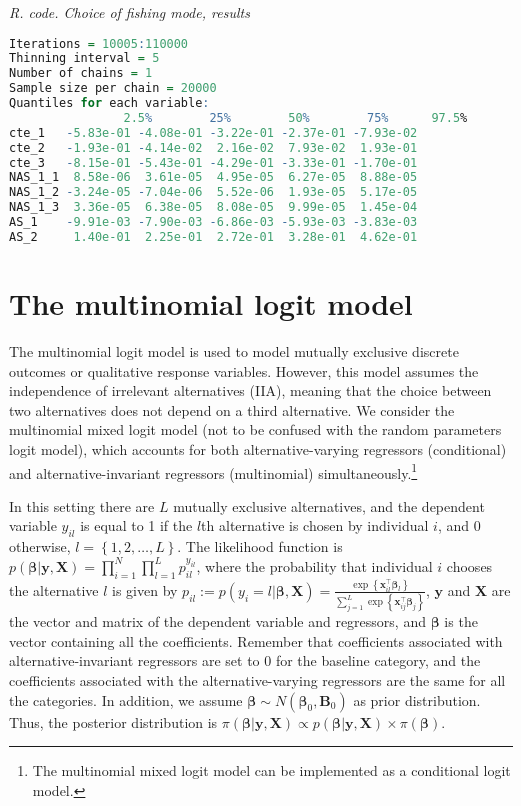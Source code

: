 \begin{tcolorbox}[enhanced,width=4.67in,center upper,
	fontupper=\large\bfseries,drop shadow southwest,sharp corners]
	\textit{R. code. Choice of fishing mode, results}
	\begin{VF}
		\begin{lstlisting}[language=R]	
Iterations = 10005:110000
Thinning interval = 5 
Number of chains = 1 
Sample size per chain = 20000 
Quantiles for each variable:
				2.5%        25%        50%        75%      97.5%
cte_1   -5.83e-01 -4.08e-01 -3.22e-01 -2.37e-01 -7.93e-02
cte_2   -1.93e-01 -4.14e-02  2.16e-02  7.93e-02  1.93e-01
cte_3   -8.15e-01 -5.43e-01 -4.29e-01 -3.33e-01 -1.70e-01
NAS_1_1  8.58e-06  3.61e-05  4.95e-05  6.27e-05  8.88e-05
NAS_1_2 -3.24e-05 -7.04e-06  5.52e-06  1.93e-05  5.17e-05
NAS_1_3  3.36e-05  6.38e-05  8.08e-05  9.99e-05  1.45e-04
AS_1    -9.91e-03 -7.90e-03 -6.86e-03 -5.93e-03 -3.83e-03
AS_2     1.40e-01  2.25e-01  2.72e-01  3.28e-01  4.62e-01		\end{lstlisting}
	\end{VF}
\end{tcolorbox} 


\section{The multinomial logit model}\label{sec65}

The multinomial logit model is used to model mutually exclusive discrete outcomes or qualitative response variables. However, this model assumes the independence of irrelevant alternatives (IIA), meaning that the choice between two alternatives does not depend on a third alternative. We consider the multinomial mixed logit model (not to be confused with the random parameters logit model), which accounts for both alternative-varying regressors (conditional) and alternative-invariant regressors (multinomial) simultaneously.\footnote{The multinomial mixed logit model can be implemented as a conditional logit model.}

In this setting there are $L$ mutually exclusive alternatives, and the dependent variable $y_{il}$ is equal to 1 if the $l$th alternative is chosen by individual $i$, and 0 otherwise, $l=\left\{1,2,\dots,L\right\}$. The likelihood function is $p(\bm{\beta}|\bm{y},\bm{X})=\prod_{i=1}^{N}\prod_{l=1}^{L}p_{il}^{y_{il}}$, where the probability that individual $i$ chooses the alternative $l$ is given by $p_{il}:=p(y_i=l|\bm{\beta},\bm{X})=\frac{\exp\left\{\bm{x}_{il}^{\top}\bm{\beta}_l\right\}}{\sum_{j=1}^{L}\exp\left\{\bm{x}_{ij}^{\top}\bm{\beta}_j\right\}}$, $\bm{y}$ and $\bm{X}$ are the vector and matrix of the dependent variable and regressors, and $\bm{\beta}$ is the vector containing all the coefficients. Remember that coefficients associated with alternative-invariant regressors are set to 0 for the baseline category, and the coefficients associated with the alternative-varying regressors are the same for all the categories. In addition, we assume $\bm{\beta}\sim N(\bm{\beta}_0,\bm{B}_0)$ as prior distribution. Thus, the posterior distribution is $\pi(\bm{\beta}|\bm{y},\bm{X})\propto p(\bm{\beta}|\bm{y},\bm{X})\times \pi(\bm{\beta})$.

